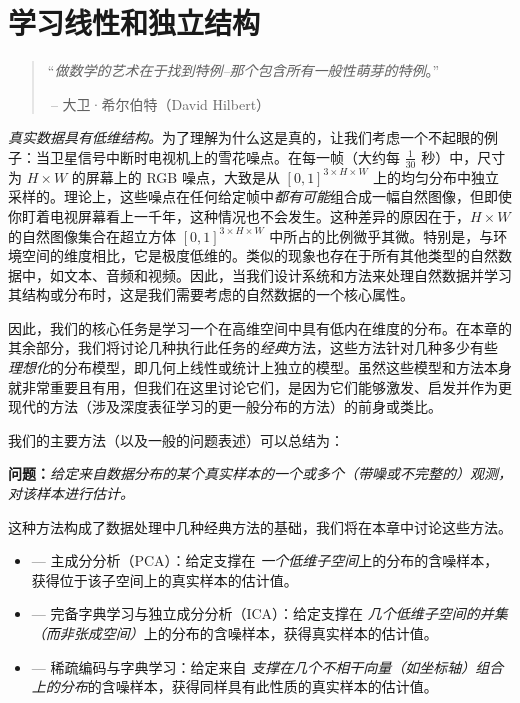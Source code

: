 \documentclass[../../book-main_zh.tex]{subfiles}
\begin{document}
\chapter{学习线性和独立结构}
\label{ch:classic-models}

\begin{quote}
    \hfill  ``{\em 做数学的艺术在于找到特例--那个包含所有一般性萌芽的特例}。''

    $~$\hfill -- 大卫·希尔伯特（David Hilbert）
\end{quote}
\vspace{5mm}

\textit{真实数据具有低维结构。}为了理解为什么这是真的，让我们考虑一个不起眼的例子：当卫星信号中断时电视机上的雪花噪点。在每一帧（大约每
\(\frac{1}{30}\) 秒）中，尺寸为 \(H \times W\) 的屏幕上的 RGB 噪点，大致是从 \([0, 1]^{3
\times H \times W}\)
上的均匀分布中独立采样的。理论上，这些噪点在任何给定帧中\textit{都有可能}组合成一幅自然图像，但即使你盯着电视屏幕看上一千年，这种情况也不会发生。这种差异的原因在于，\(H
\times W\) 的自然图像集合在超立方体 \([0, 1]^{3 \times H \times W}\)
中所占的比例微乎其微。特别是，与环境空间的维度相比，它是极度低维的。类似的现象也存在于所有其他类型的自然数据中，如文本、音频和视频。因此，当我们设计系统和方法来处理自然数据并学习其结构或分布时，这是我们需要考虑的自然数据的一个核心属性。
%

因此，我们的核心任务是学习一个在高维空间中具有低内在维度的分布。在本章的其余部分，我们将讨论几种执行此任务的\textit{经典}方法，这些方法针对几种多少有些{\em
理想化}的分布模型，即几何上线性或统计上独立的模型。虽然这些模型和方法本身就非常重要且有用，但我们在这里讨论它们，是因为它们能够激发、启发并作为更现代的方法（涉及深度表征学习的更一般分布的方法）的前身或类比。

我们的主要方法（以及一般的问题表述）可以总结为：
\begin{tcolorbox}\centering
    \textbf{问题：}\textit{给定来自数据分布的某个真实样本的一个或多个（带噪或不完整的）观测，对该样本进行估计。}
\end{tcolorbox}
这种方法构成了数据处理中几种经典方法的基础，我们将在本章中讨论这些方法。
\begin{itemize}
    \item {} --- 主成分分析（PCA）：给定支撑在{\em
        一个低维子空间}上的分布的含噪样本，获得位于该子空间上的真实样本的估计值。
    \item  {} --- 完备字典学习与独立成分分析（ICA）：给定支撑在{\em
        几个低维子空间的并集（\textit{而非}张成空间）}上的分布的含噪样本，获得真实样本的估计值。
    \item {} --- 稀疏编码与字典学习：给定来自{\em
        支撑在几个不相干向量（如坐标轴）组合上的分布}的含噪样本，获得同样具有此性质的真实样本的估计值。
\end{itemize}
\end{document}
